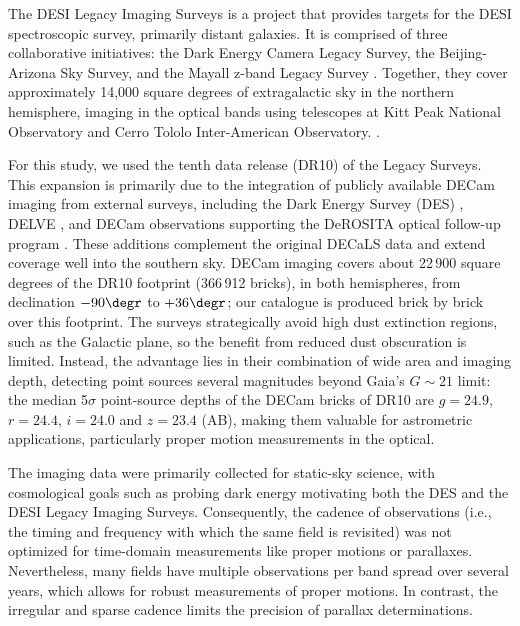 \documentclass[usenatbib]{mnras}   %
\begin{document}
The DESI Legacy Imaging Surveys is a project that provides targets for the DESI spectroscopic survey, primarily distant galaxies. It is comprised of three collaborative initiatives: the Dark Energy Camera Legacy Survey, the Beijing-Arizona Sky Survey, and the Mayall z-band Legacy Survey \citep{legacy2019}. Together, they cover approximately 14,000 square degrees of extragalactic sky in the northern hemisphere, imaging in the optical bands using telescopes at Kitt Peak National Observatory and Cerro Tololo Inter-American Observatory. \citep{legacy2019}.

For this study, we used the tenth data release (DR10) of the Legacy Surveys. This expansion is primarily due to the integration of publicly available DECam imaging from external surveys, including the Dark Energy Survey (DES) \citep{DES}, DELVE \citep{DELVE}, and DECam observations supporting the DeROSITA optical follow-up program \citep{DeROSITA}. These additions complement the original DECaLS data and extend coverage well into the southern sky. DECam imaging covers about 22\,900 square degrees of the DR10 footprint (366\,912 bricks), in both hemispheres, from declination $-90\degr$ to $+36\degr$; our catalogue is produced brick by brick over this footprint. The surveys strategically avoid high dust extinction regions, such as the Galactic plane, so the benefit from reduced dust obscuration is limited. Instead, the advantage lies in their combination of wide area and imaging depth, detecting point sources several magnitudes beyond Gaia's $G \sim 21$ limit: the median 5$\sigma$ point-source depths of the DECam bricks of DR10 are $g = 24.9$, $r = 24.4$, $i = 24.0$ and $z = 23.4$ (AB), making them valuable for astrometric applications, particularly proper motion measurements in the optical.


The imaging data were primarily collected for static-sky science, with cosmological goals such as probing dark energy motivating both the DES and the DESI Legacy Imaging Surveys. Consequently, the cadence of observations (i.e., the timing and frequency with which the same field is revisited) was not optimized for time-domain measurements like proper motions or parallaxes. Nevertheless, many fields have multiple observations per band spread over several years, which allows for robust measurements of proper motions. In contrast, the irregular and sparse cadence limits the precision of parallax determinations.
\end{document}
